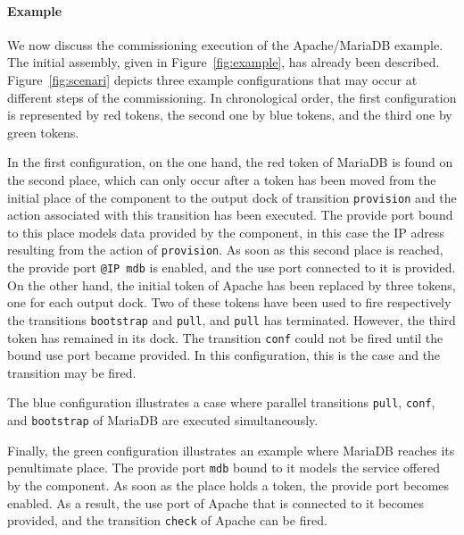 \paragraph{Example}{
We now discuss the commissioning execution of the Apache/MariaDB
example. The initial assembly, given in Figure~\ref{fig:example}, has
already been described. Figure~\ref{fig:scenari} depicts three example
configurations that may occur at different steps of the
commissioning. In chronological order, the first configuration is
represented by red tokens, the second one by blue tokens, and the
third one by green tokens.

In the first configuration, on the one hand, the red token of MariaDB
is found on the second place, which can only occur after a token has
been moved from the initial place of the component to the output dock
of transition \texttt{provision} and the action associated with this
transition has been executed. The provide port bound to this place
models data provided by the component, in this case the IP adress
resulting from the action of \texttt{provision}. As soon as this
second place is reached, the provide port \texttt{@IP mdb} is enabled,
and the use port connected to it is provided. On the other hand, the
initial token of Apache has been replaced by three tokens, one for
each output dock. Two of these tokens have been used to fire
respectively the transitions \texttt{bootstrap} and \texttt{pull}, and
\texttt{pull} has terminated. However, the third token has remained in
its dock. The transition \texttt{conf} could not be fired until the
bound use port became provided. In this configuration, this is the
case and the transition may be fired.

The blue configuration illustrates a case where parallel transitions
\texttt{pull}, \texttt{conf}, and \texttt{bootstrap} of MariaDB are
executed simultaneously.

Finally, the green configuration illustrates an example where MariaDB
reaches its penultimate place. The provide port \texttt{mdb} bound to
it models the service offered by the component. As soon as the place
holds a token, the provide port becomes enabled. As a result, the use
port of Apache that is connected to it becomes provided, and the
transition \texttt{check} of Apache can be fired.}
